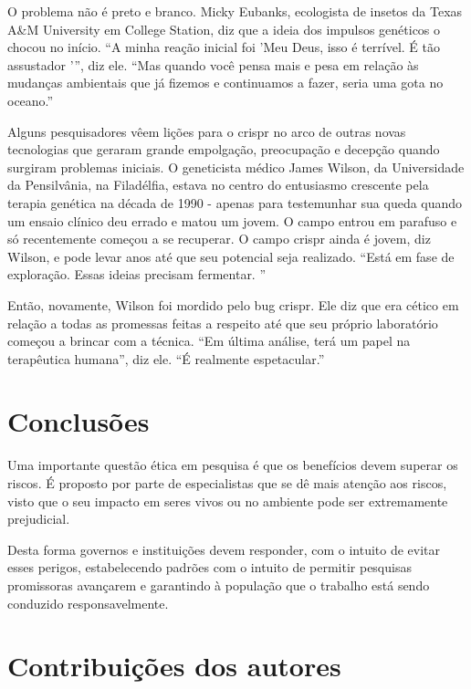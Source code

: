 \documentclass{report}
\begin{document}
O problema não é preto e branco. Micky Eubanks, ecologista de insetos da Texas A\&M University em College Station, diz que a ideia dos impulsos genéticos o chocou no início. “A minha reação inicial foi 'Meu Deus, isso é terrível. É tão assustador '”, diz ele. “Mas quando você pensa mais e pesa em relação às mudanças ambientais que já fizemos e continuamos a fazer, seria uma gota no oceano.”

Alguns pesquisadores vêem lições para o \ac{crispr} no arco de outras novas tecnologias que geraram grande empolgação, preocupação e decepção quando surgiram problemas iniciais. O geneticista médico James Wilson, da Universidade da Pensilvânia, na Filadélfia, estava no centro do entusiasmo crescente pela terapia genética na década de 1990 - apenas para testemunhar sua queda quando um ensaio clínico deu errado e matou um jovem. O campo entrou em parafuso e só recentemente começou a se recuperar. O campo \ac{crispr} ainda é jovem, diz Wilson, e pode levar anos até que seu potencial seja realizado. “Está em fase de exploração. Essas ideias precisam fermentar. ”\par

Então, novamente, Wilson foi mordido pelo bug \ac{crispr}. Ele diz que era cético em relação a todas as promessas feitas a respeito até que seu próprio laboratório começou a brincar com a técnica. “Em última análise, terá um papel na terapêutica humana”, diz ele. “É realmente espetacular.”





\chapter{Conclusões}
\label{chap.conclusões}
Uma importante questão ética em pesquisa é que os benefícios devem superar os riscos.
É proposto por parte de especialistas que se dê mais atenção aos riscos, visto que o seu impacto em seres vivos ou no ambiente pode ser extremamente prejudicial. 

Desta forma governos e instituições devem responder, com o intuito de evitar esses perigos, estabelecendo padrões com o intuito de permitir pesquisas promissoras avançarem e garantindo à população que o trabalho está sendo conduzido responsavelmente.




\chapter*{Contribuições dos autores}
\end{document}
